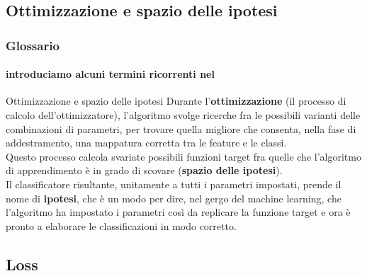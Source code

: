 \subsection[Ottimizzazione e spazio delle ipotesi]{Ottimizzazione e spazio delle ipotesi}
\begin{frame}

	\frametitle{Glossario}
	\framesubtitle{introduciamo alcuni termini ricorrenti nel \ml}

	\begin{block}{Ottimizzazione e spazio delle ipotesi}
		Durante l’\textbf{ottimizzazione} (il processo di calcolo dell’ottimizzatore), l’algoritmo svolge ricerche fra le possibili varianti delle combinazioni di parametri, per trovare quella migliore che consenta, nella fase di addestramento, una mappatura corretta tra le feature e le classi.\\
		\vspace{3mm}
		Questo processo calcola svariate possibili funzioni target fra quelle che l’algoritmo di apprendimento è in grado di scovare (\textbf{spazio delle ipotesi}).\\
		\vspace{3mm}
		Il classificatore risultante, unitamente a tutti i parametri impostati, prende il nome di \textbf{ipotesi}, che è un modo per dire, nel gergo del machine learning, che l’algoritmo ha impostato i parametri così da replicare la funzione target e ora è pronto a elaborare le classificazioni in modo corretto.
	\end{block}

\end{frame}


\subsection[Loss]{Loss}


